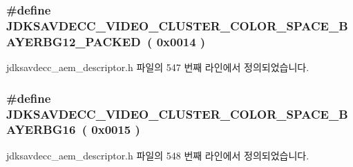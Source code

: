 \subsubsection[{\texorpdfstring{J\+D\+K\+S\+A\+V\+D\+E\+C\+C\+\_\+\+V\+I\+D\+E\+O\+\_\+\+C\+L\+U\+S\+T\+E\+R\+\_\+\+C\+O\+L\+O\+R\+\_\+\+S\+P\+A\+C\+E\+\_\+\+B\+A\+Y\+E\+R\+B\+G12\+\_\+\+P\+A\+C\+K\+ED}{JDKSAVDECC_VIDEO_CLUSTER_COLOR_SPACE_BAYERBG12_PACKED}}]{\setlength{\rightskip}{0pt plus 5cm}\#define J\+D\+K\+S\+A\+V\+D\+E\+C\+C\+\_\+\+V\+I\+D\+E\+O\+\_\+\+C\+L\+U\+S\+T\+E\+R\+\_\+\+C\+O\+L\+O\+R\+\_\+\+S\+P\+A\+C\+E\+\_\+\+B\+A\+Y\+E\+R\+B\+G12\+\_\+\+P\+A\+C\+K\+ED~( 0x0014 )}\hypertarget{group__video__cluster__color__space_ga223cd49c15bb803fcfb5cc464acc5cb5}{}\label{group__video__cluster__color__space_ga223cd49c15bb803fcfb5cc464acc5cb5}


jdksavdecc\+\_\+aem\+\_\+descriptor.\+h 파일의 547 번째 라인에서 정의되었습니다.

\subsubsection[{\texorpdfstring{J\+D\+K\+S\+A\+V\+D\+E\+C\+C\+\_\+\+V\+I\+D\+E\+O\+\_\+\+C\+L\+U\+S\+T\+E\+R\+\_\+\+C\+O\+L\+O\+R\+\_\+\+S\+P\+A\+C\+E\+\_\+\+B\+A\+Y\+E\+R\+B\+G16}{JDKSAVDECC_VIDEO_CLUSTER_COLOR_SPACE_BAYERBG16}}]{\setlength{\rightskip}{0pt plus 5cm}\#define J\+D\+K\+S\+A\+V\+D\+E\+C\+C\+\_\+\+V\+I\+D\+E\+O\+\_\+\+C\+L\+U\+S\+T\+E\+R\+\_\+\+C\+O\+L\+O\+R\+\_\+\+S\+P\+A\+C\+E\+\_\+\+B\+A\+Y\+E\+R\+B\+G16~( 0x0015 )}\hypertarget{group__video__cluster__color__space_gac21ff75ba68e55f3e30cca461c9f42a0}{}\label{group__video__cluster__color__space_gac21ff75ba68e55f3e30cca461c9f42a0}


jdksavdecc\+\_\+aem\+\_\+descriptor.\+h 파일의 548 번째 라인에서 정의되었습니다.

